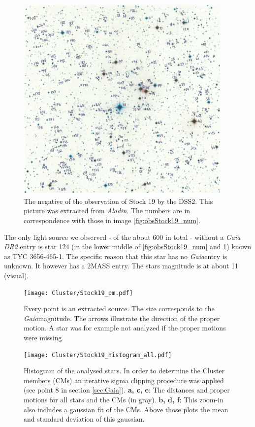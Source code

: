 \documentclass{article}
\begin{document}
\begin{figure}[H]
  \centering
    \includegraphics[width=0.95\textwidth]{Cluster/DSS2Stock19_num.jpg}
  \caption{The negative of the observation of Stock 19 by the DSS2. This picture was extracted from \textit{Aladin}. The numbers are in correspondence with those in image \ref{fig:obsStock19_num}.}
  \label{fig:DSS2Stock19_num}
\end{figure}

The only light source we observed - of the about 600 in total - without a \textit{Gaia DR2} entry is star 124 (in the lower middle of \ref{fig:obsStock19_num} and \ref{fig:DSS2Stock19_num}) known as TYC 3656-465-1. The specific reason that this star has no \textit{Gaia}entry is unknown. It however has a 2MASS entry. The stars magnitude is at about 11 (visual).  

\begin{figure}[H]
  \centering
    \texttt{[image: Cluster/Stock19\_pm.pdf]}
  \caption{Every point is an extracted source. The size corresponds to the \textit{Gaia}magnitude. The arrows illustrate the direction of the proper motion. A star was for example not analyzed if the proper motions were missing.}
  \label{fig:Stock19_pm}
\end{figure}

\begin{figure}[H]
  \centering
    \texttt{[image: Cluster/Stock19\_histogram\_all.pdf]}
  \caption{Histogram of the analysed stars. In order to determine the Cluster members (CMs) an iterative sigma clipping procedure was applied (see point 8 in section \ref{sec:Gaia}). \textbf{a, c, e}: The distances and proper motions for all stars and the CMs (in gray). \textbf{b, d, f}: This zoom-in also includes a gaussian fit of the CMs. Above those plots the mean and standard deviation of this gaussian.}
  \label{fig:Stock19_histogram_all}
\end{figure}
\end{document}
